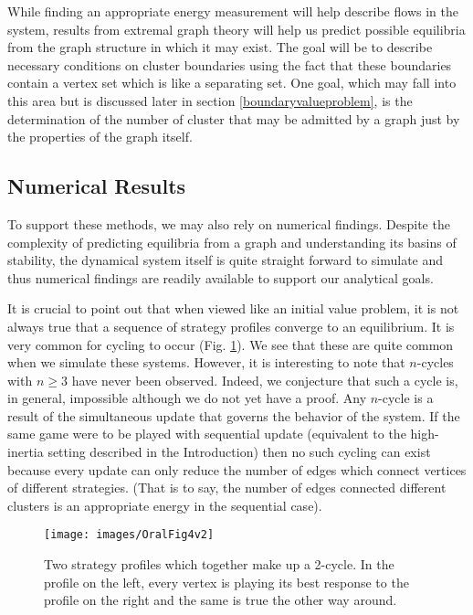 \documentclass[]{article}
\begin{document}
		While finding an appropriate energy measurement will help describe flows in the system, results from extremal graph theory will help us predict possible equilibria from the graph structure in which it may exist. The goal will be to describe necessary conditions on cluster boundaries using the fact that these boundaries contain a vertex set which is like a separating set\cite{ExtremalGraphTheory}. One goal, which may fall into this area but is discussed later in section \ref{boundaryvalueproblem}, is the determination of the number of cluster that may be admitted by a graph just by the properties of the graph itself. 
		\subsection{Numerical Results}\label{numericalresults}
		To support these methods, we may also rely on numerical findings. Despite the complexity of predicting equilibria from a graph and understanding its basins of stability, the dynamical system itself is quite straight forward to simulate and thus numerical findings are readily available to support our analytical goals. 
		
		
		It is crucial to point out that when viewed like an initial value problem, it is not always true that a sequence of strategy profiles converge to an equilibrium. It is very common for cycling to occur (Fig. \ref{cycle}). We see that these are quite common when we simulate these systems. However, it is interesting to note that $n$-cycles with $n\geq 3$ have never been observed. Indeed, we conjecture that such a cycle is, in general, impossible although we do not yet have a proof. Any $n$-cycle is a result of the simultaneous update that governs the behavior of the system. If the same game were to be played with sequential update (equivalent to the high-inertia setting described in the Introduction) then no such cycling can exist because every update can only reduce the number of edges which connect vertices of different strategies. (That is to say, the number of edges connected different clusters is an appropriate energy in the sequential case).
		
		\begin{figure}
			\texttt{[image: images/OralFig4v2]}
			\caption{Two strategy profiles which together make up a 2-cycle. In the profile on the left, every vertex is playing its best response to the profile on the right and the same is true the other way around.}
			\label{cycle} 
		\end{figure}
\end{document}
